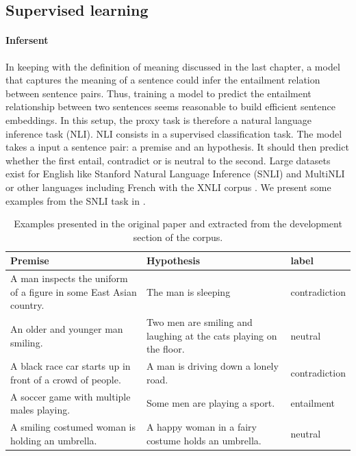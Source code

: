 
\subsection{Supervised learning}

\paragraph{Infersent} In keeping with the definition of meaning discussed in the last chapter, a model that captures the meaning of a sentence could infer the entailment relation between sentence pairs. Thus, training a model to predict the entailment relationship between two sentences seems reasonable to build efficient sentence embeddings. In this setup, the proxy task is therefore a natural language inference task (NLI). NLI consists in a supervised classification task. The model takes a input a sentence pair: a premise and an hypothesis. It should then predict whether the first entail, contradict or is neutral to the second. Large datasets exist for English like Stanford Natural Language Inference (SNLI) \parencite{bowman_15} and MultiNLI \parencite{williams_18b} or other languages including French with the XNLI corpus \parencite{conneau_18b}. We present some examples from the SNLI task in .

\begin{table}[!htb]
\centering
\small
\begin{tabularx}{\textwidth}{@{}YYY@{} }
  \toprule
Premise & Hypothesis & label \\
\midrule
\midrule 
A man inspects the uniform of a figure in some East Asian country. & The man is sleeping & contradiction\\
\rule{0pt}{3ex}An older and younger man smiling. & Two men are smiling and laughing at the cats playing on the floor. & neutral\\
\rule{0pt}{3ex}A black race car starts up in front of a crowd of people. & A man is driving down a lonely road. & contradiction\\
\rule{0pt}{3ex}A soccer game with multiple males playing. & Some men are playing a sport. & entailment\\
\rule{0pt}{3ex}A smiling costumed woman is holding an umbrella. & A happy woman in a fairy costume holds an umbrella. & neutral\\
    \bottomrule
  \end{tabularx}
  \caption{Examples presented in the original paper and extracted from the development section of the corpus.}
\end{table}


